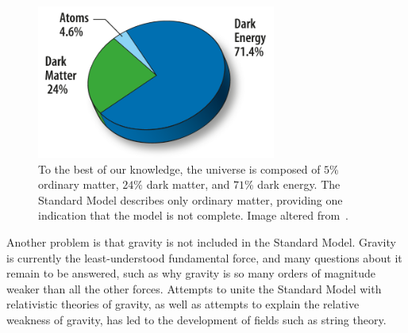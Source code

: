 \begin{figure}[htbp]
    \centering
    \includegraphics[width=0.7\textwidth]{Images/universe_composition.png}
    \caption{To the best of our knowledge, the universe is composed of $5\%$ ordinary matter, $24\%$ dark matter, and $71\%$ dark energy. The Standard Model describes only ordinary matter, providing one indication that the model is not complete. Image altered from~\cite{universe_composition}.}
    \label{fig:universe_composition}
\end{figure}

Another problem is that gravity is not included in the Standard Model. Gravity is currently the least-understood fundamental force, and many questions about it remain to be answered, such as why gravity is so many orders of magnitude weaker than all the other forces. Attempts to unite the Standard Model with relativistic theories of gravity, as well as attempts to explain the relative weakness of gravity, has led to the development of fields such as string theory.

